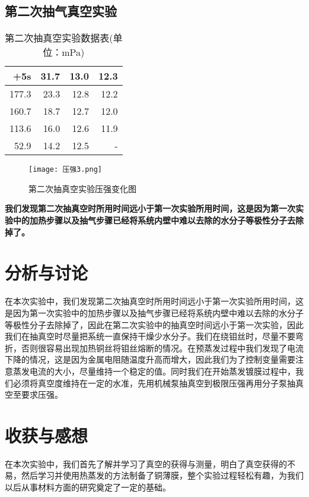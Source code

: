 \documentclass[UTF8]{ctexart}
\begin{document}
\subsection{第二次抽气真空实验}
\begin{table}[H]
	\centering
	\caption{第二次抽真空实验数据表(单位：mPa)}
	\begin{tabular}{|r|r|r|r|}
		\toprule[0.5mm]
		+5s & 31.7  & 13.0    & 12.3 \\
		\hline
		177.3 & 23.3  & 12.8  & 12.2 \\
		\hline
		160.7 & 18.7  & 12.7  & 12.0 \\
		\hline
		113.6 & 16.0    & 12.6  & 11.9 \\
		\hline
		52.9  & 14.2  & 12.5  & - \\
		\bottomrule[0.5mm]
	\end{tabular}
\end{table}
	\begin{figure}[H]
	\begin{center}
		\texttt{[image: 压强3.png]}
		\caption{第二次抽真空实验压强变化图}
	\end{center}
\end{figure}
\par \textbf{我们发现第二次抽真空时所用时间远小于第一次实验所用时间，这是因为第一次实验中的加热步骤以及抽气步骤已经将系统内壁中难以去除的水分子等极性分子去除掉了。}
	\section{分析与讨论}
	在本次实验中，我们发现第二次抽真空时所用时间远小于第一次实验所用时间，这是因为第一次实验中的加热步骤以及抽气步骤已经将系统内壁中难以去除的水分子等极性分子去除掉了，因此在第二次实验中的抽真空时间远小于第一次实验，因此我们在抽真空时尽量把系统一直保持干燥少水分子。我们在绕钼丝时，尽量不要弯折，否则很容易出现加热铜丝将钼丝熔断的情况。在预蒸发过程中我们发现了电流下降的情况，这是因为金属电阻随温度升高而增大，因此我们为了控制变量需要注意蒸发电流的大小，尽量维持一个稳定的值。同时我们在开始蒸发镀膜过程中，我们必须将真空度维持在一定的水准，先用机械泵抽真空到极限压强再用分子泵抽真空至要求压强。
	\section{收获与感想}
	在本次实验中，我们首先了解并学习了真空的获得与测量，明白了真空获得的不易，然后学习并使用热蒸发的方法制备了铜薄膜，整个实验过程轻松有趣，为我们以后从事材料方面的研究奠定了一定的基础。
\end{document}
